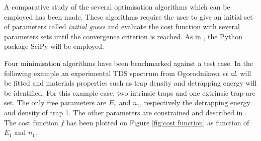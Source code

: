 A comparative study of the several optimisation algorithms which can be employed has been made.
These algorithms require the user to give an initial set of parameters called \textit{initial guess} and evaluate the cost function with several parameters sets until the convergence criterion is reached.
As in , the Python package SciPy  will be employed.

Four minimisation algorithms have been benchmarked against a test case.
In the following example an experimental TDS spectrum from Ogorodnikova \textit{et al.}  will be fitted and materials properties such as trap density and detrapping energy will be identified.
For this example case, two intrinsic traps and one extrinsic trap are set.
The only free parameters are $E_1$ and $n_1$, respectively the detrapping energy and density of trap 1.
The other parameters are constrained and described in .
The cost function $f$ has been plotted on Figure \ref{fig:cost function} as function of $E_1$ and $n_1$.

